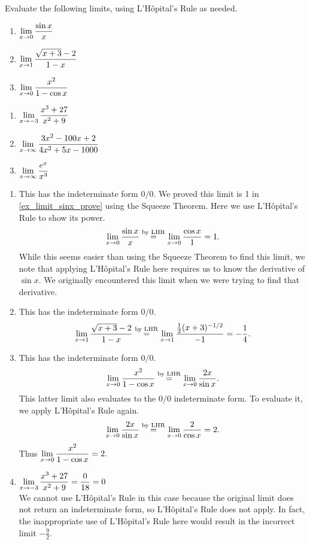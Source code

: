 \begin{example}\label{ex_lhr1}%
Evaluate the following limits, using L'Hôpital's Rule as needed.\\
\begin{minipage}[t]{.5\textwidth}
\begin{enumerate}
\item		$\displaystyle \lim_{x\to0}\frac{\sin x}x$
\item		$\displaystyle \lim_{x\to 1}\frac{\sqrt{x+3}-2}{1-x}$
\item		$\displaystyle \lim_{x\to0}\frac{x^2}{1-\cos x}$
\end{enumerate}
\end{minipage}%
\begin{minipage}[t]{.5\textwidth}
\begin{enumerate}\addtocounter{enumi}{3}
	\item	$\displaystyle\lim_{x\to-3}\frac{x^3+27}{x^2+9}$
	\item	$\displaystyle\lim_{x\to\infty}\frac{3x^2-100x+2}{4x^2+5x-1000}$
	\item	$\displaystyle\lim_{x\to\infty}\frac{e^x}{x^3}$
\end{enumerate}
\end{minipage}
\solution
\begin{enumerate}
	\item	This has the indeterminate form $0/0$. We proved this limit is 1 in \autoref{ex_limit_sinx_prove} using the Squeeze Theorem. Here we use L'Hôpital's Rule to show its power.
\[\lim_{x\to0}\frac{\sin x}x \mathrel{\overset{\text{by LHR}}{=}} \lim_{x\to0} \frac{\cos x}{1}=1.\]
While this seems easier than using the Squeeze Theorem to find this limit, we note that applying L'Hôpital's Rule here requires us to know the derivative of $\sin x$. We originally encountered this limit when we were trying to find that derivative.

	\item	This has the indeterminate form $0/0$.
\[\lim_{x\to 1}\frac{\sqrt{x+3}-2}{1-x} 	 \mathrel{\overset{\text{by LHR}}{=}} \lim_{x \to 1} \frac{\frac12(x+3)^{-1/2}}{-1} =-\frac 14.\]

	\item	This has the indeterminate form $0/0$.
\[\lim_{x\to 0}\frac{x^2}{1-\cos x}  \mathrel{\overset{\text{by LHR}}{=}}  \lim_{x\to 0} \frac{2x}{\sin x}.\]
This latter limit also evaluates to the $0/0$ indeterminate form. To evaluate it, we apply L'Hôpital's Rule again.
\[
 \lim_{x\to 0} \frac{2x}{\sin x}
 \mathrel{\overset{\text{by LHR}}{=}} \lim_{x\to 0} \frac{2}{\cos x} = 2 .
\]
Thus $\displaystyle \lim_{x\to0}\frac{x^2}{1-\cos x}=2.$

	\item \hfill$\displaystyle\lim_{x\to-3}\frac{x^3+27}{x^2+9}
	 =\frac0{18}=0$\hfill\null\smallskip\\
We cannot use L'Hôpital's Rule in this case because the original limit does not return an indeterminate form, so L'Hôpital's Rule does not apply. In fact, the inappropriate use of L'Hôpital's Rule here would result in the incorrect limit $-\frac92$.


\end{enumerate}
\end{example}
